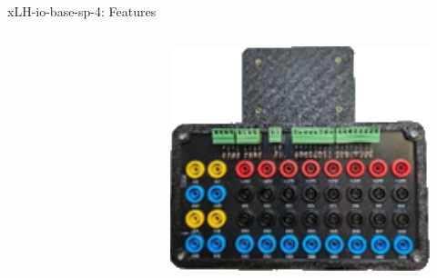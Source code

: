 \documentclass[10pt]{beamer}
\begin{document}
            \begin{frame}{xLH-io-base-sp-4: Features}
                \begin{columns}
                    \begin{column}{0.75\textwidth}
                        
                    \end{column}
                    \begin{column}{0.25\textwidth}
                        \begin{figure}[h]
                            \centering
                            \includegraphics[width=1.0\textwidth]{graphics/xLH-io-base-sp-4}
                        \end{figure}
                    \end{column}
                \end{columns}
            \end{frame}
\end{document}
